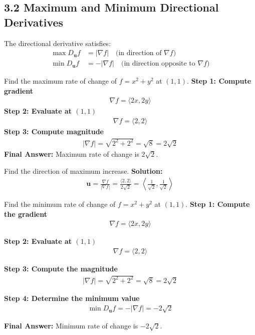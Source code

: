 \subsection*{3.2 Maximum and Minimum Directional Derivatives}

\begin{conceptbox}
    The directional derivative satisfies:
    \begin{align*}
        \max D_{\mathbf{u}} f & = |\nabla f| \quad \text{(in direction of } \nabla f\text{)}           \\
        \min D_{\mathbf{u}} f & = -|\nabla f| \quad \text{(in direction opposite to } \nabla f\text{)}
    \end{align*}
\end{conceptbox}
\begin{examplebox} Find the maximum rate of change of $f=x^2+y^2$ at $(1,1)$.
    \textbf{Step 1: Compute gradient}
    \begin{align*}
        \nabla f = \langle 2x,2y\rangle
    \end{align*}
    \textbf{Step 2: Evaluate at $(1,1)$}
    \begin{align*}
        \nabla f = \langle2,2\rangle
    \end{align*}
    \textbf{Step 3: Compute magnitude}
    \begin{align*}
        |\nabla f| = \sqrt{2^2+2^2} = \sqrt{8} = 2\sqrt{2}
    \end{align*}
    \textbf{Final Answer:}
    Maximum rate of change is $2\sqrt{2}$.
\end{examplebox}
\begin{examplebox}
    Find the direction of maximum increase.
    \textbf{Solution:}
    \begin{align*}
        \mathbf{u} = \frac{\nabla f}{|\nabla f|} = \frac{\langle2,2\rangle}{2\sqrt{2}} = \left\langle \frac{1}{\sqrt{2}}, \frac{1}{\sqrt{2}} \right\rangle
    \end{align*}
\end{examplebox}
\begin{examplebox}
    Find the minimum rate of change of $f=x^2+y^2$ at $(1,1)$.
    \textbf{Step 1: Compute the gradient}
    \begin{align*}
        \nabla f = \langle 2x, 2y \rangle
    \end{align*}

    \textbf{Step 2: Evaluate at $(1,1)$}
    \begin{align*}
        \nabla f = \langle 2,2 \rangle
    \end{align*}

    \textbf{Step 3: Compute the magnitude}
    \begin{align*}
        |\nabla f| = \sqrt{2^2 + 2^2} = \sqrt{8} = 2\sqrt{2}
    \end{align*}

    \textbf{Step 4: Determine the minimum value}
    \begin{align*}
        \min D_{\mathbf{u}} f = -|\nabla f| = -2\sqrt{2}
    \end{align*}

    \textbf{Final Answer:} Minimum rate of change is $-2\sqrt{2}$.
\end{examplebox}

